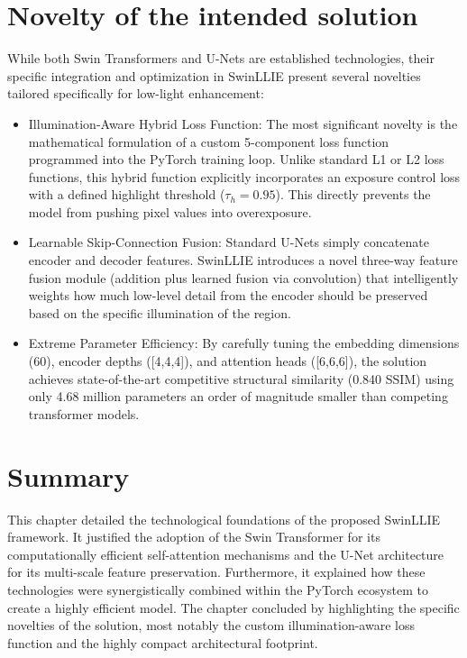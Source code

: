 \documentclass[12pt, a4paper]{report}
\begin{document}
\section{Novelty of the intended solution}
While both Swin Transformers and U-Nets are established technologies, their specific integration and optimization in SwinLLIE present several novelties tailored specifically for low-light enhancement:
\begin{itemize}
    \item Illumination-Aware Hybrid Loss Function: The most significant novelty is the mathematical formulation of a custom 5-component loss function programmed into the PyTorch training loop. Unlike standard L1 or L2 loss functions, this hybrid function explicitly incorporates an exposure control loss with a defined highlight threshold ($\tau_h = 0.95$). This directly prevents the model from pushing pixel values into overexposure.
    \item Learnable Skip-Connection Fusion: Standard U-Nets simply concatenate encoder and decoder features. SwinLLIE introduces a novel three-way feature fusion module (addition plus learned fusion via convolution) that intelligently weights how much low-level detail from the encoder should be preserved based on the specific illumination of the region.
    \item Extreme Parameter Efficiency: By carefully tuning the embedding dimensions (60), encoder depths ([4,4,4]), and attention heads ([6,6,6]), the solution achieves state-of-the-art competitive structural similarity (0.840 SSIM) using only 4.68 million parameters an order of magnitude smaller than competing transformer models.
\end{itemize}

\section{Summary}
This chapter detailed the technological foundations of the proposed SwinLLIE framework. It justified the adoption of the Swin Transformer for its computationally efficient self-attention mechanisms and the U-Net architecture for its multi-scale feature preservation. Furthermore, it explained how these technologies were synergistically combined within the PyTorch ecosystem to create a highly efficient model. The chapter concluded by highlighting the specific novelties of the solution, most notably the custom illumination-aware loss function and the highly compact architectural footprint.
\end{document}
